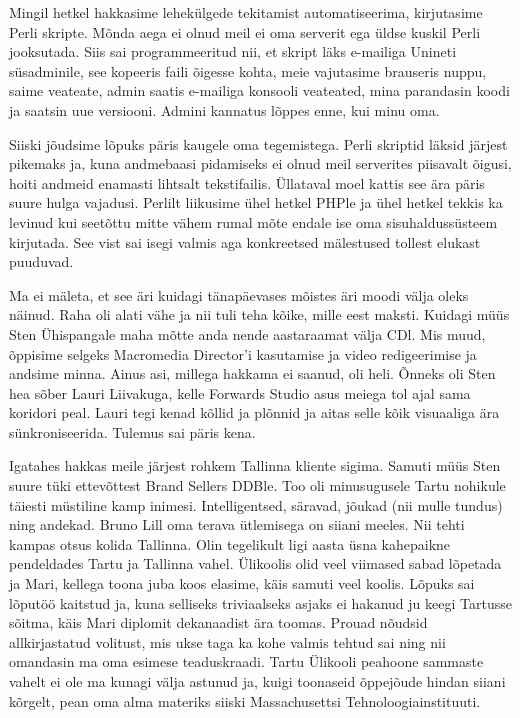 Mingil hetkel hakkasime lehekülgede tekitamist automatiseerima, kirjutasime Perli skripte. Mõnda aega ei olnud meil ei oma serverit ega üldse kuskil Perli jooksutada. Siis sai programmeeritud nii, et skript läks e-mailiga Unineti süsadminile, see kopeeris faili õigesse kohta, meie vajutasime brauseris nuppu, saime veateate, admin saatis e-mailiga konsooli veateated, mina parandasin koodi ja saatsin uue versiooni. Admini kannatus lõppes enne, kui minu oma. 

Siiski jõudsime lõpuks päris kaugele oma tegemistega. Perli skriptid läksid järjest pikemaks ja, kuna andmebaasi pidamiseks ei olnud meil serverites piisavalt õigusi, hoiti andmeid enamasti lihtsalt tekstifailis. Üllataval moel kattis see ära päris suure hulga vajadusi. Perlilt liikusime ühel hetkel PHPle ja ühel hetkel tekkis ka levinud kui seetõttu mitte vähem rumal mõte endale ise oma sisuhaldussüsteem kirjutada. See vist sai isegi valmis aga konkreetsed mälestused tollest elukast puuduvad. 

Ma ei mäleta, et see äri kuidagi tänapäevases mõistes äri moodi välja oleks näinud. Raha oli alati vähe ja nii tuli teha kõike, mille eest maksti. Kuidagi müüs Sten Ühispangale maha mõtte anda nende aastaraamat välja CDl. Mis muud, õppisime selgeks Macromedia Director'i kasutamise ja video redigeerimise ja andsime minna. Ainus asi, millega hakkama ei saanud, oli heli. Õnneks oli Sten hea sõber Lauri Liivakuga, kelle Forwards Studio asus meiega tol ajal sama koridori peal. Lauri tegi kenad kõllid ja plõnnid ja aitas selle kõik visuaaliga ära sünkroniseerida. Tulemus sai päris kena. 

Igatahes hakkas meile järjest rohkem Tallinna kliente sigima. Samuti müüs Sten suure tüki ettevõttest Brand Sellers DDBle. Too oli minusugusele Tartu nohikule täiesti müstiline kamp inimesi. Intelligentsed, säravad, jõukad (nii mulle tundus) ning andekad. Bruno Lill oma terava ütlemisega on siiani meeles.  Nii tehti kampas otsus kolida Tallinna. Olin tegelikult ligi aasta üsna kahepaikne pendeldades Tartu ja Tallinna vahel. Ülikoolis olid veel viimased sabad lõpetada ja Mari, kellega toona juba koos elasime, käis samuti veel koolis. Lõpuks sai lõputöö kaitstud ja, kuna selliseks triviaalseks asjaks ei hakanud ju keegi Tartusse sõitma, käis Mari diplomit dekanaadist ära toomas. Prouad nõudsid allkirjastatud volitust, mis ukse taga ka kohe valmis tehtud sai ning nii omandasin ma oma esimese teaduskraadi. Tartu Ülikooli peahoone sammaste vahelt ei ole ma kunagi välja astunud ja, kuigi toonaseid õppejõude hindan siiani kõrgelt, pean oma alma materiks siiski Massachusettsi Tehnoloogiainstituuti. 

